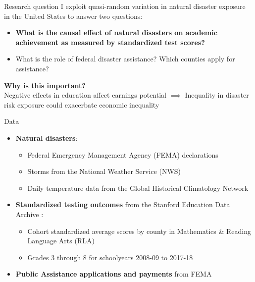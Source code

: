 \documentclass[hyperref={colorlinks = true,linkcolor = blue, citecolor=blue,urlcolor=blue}]{beamer}
\begin{document}
\begin{frame}{Research question}
	I exploit quasi-random variation in natural disaster exposure in the United States to answer two questions:
	\begin{itemize}
		\item \textbf{What is the causal effect of natural disasters on academic achievement as measured by standardized test scores?}
		\item What is the role of federal disaster assistance? Which counties apply for assistance?
	\end{itemize}
	\textbf{Why is this important?}\\
	Negative effects in education affect earnings
	potential $\implies$ Inequality in disaster risk exposure could exacerbate economic inequality
\end{frame}

\begin{frame}{Data}
	\begin{itemize}
		\item \textbf{Natural disasters}:
		\begin{itemize}
			\item Federal Emergency Management Agency (FEMA) declarations 
			\item Storms from the National Weather Service (NWS)
			\item Daily temperature data from the Global Historical Climatology Network
		\end{itemize}
		\item \textbf{Standardized testing outcomes} from the Stanford Education Data Archive \citep{SEDA}:
		\begin{itemize}
			\item Cohort standardized average scores by county in Mathematics \& Reading Language Arts (RLA)
			\item Grades 3 through 8 for schoolyears 2008-09 to 2017-18
		\end{itemize}
		\item \textbf{Public Assistance applications and payments} from FEMA
	\end{itemize}
\end{frame}
\end{document}
